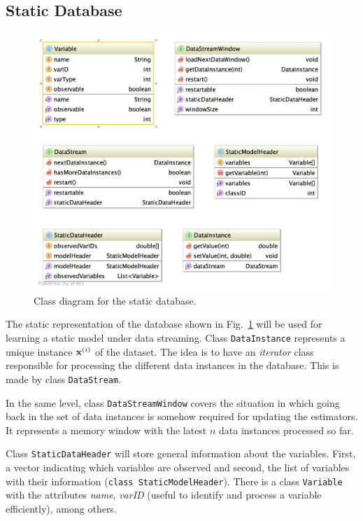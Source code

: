 \documentclass[a4paper,12pt]{article}
\begin{document}
\subsection{Static Database}
\label{subsec:staticDatabase}

\begin{figure}[h]
\includegraphics[width=14cm]{staticDB.jpg}
\caption{Class diagram for the static database.}
\label{fig:staticDB}
\end{figure}

The static representation of the database shown in  Fig.~\ref{fig:staticDB} will be 
used for learning a static model under data streaming. Class 
\texttt{DataInstance} represents a unique instance $\x^{(i)}$ of the dataset. The idea is to
have an \emph{iterator} class responsible for processing the different data instances 
in the database. This is made by class \texttt{DataStream}. 

In the same level, class \texttt{DataStreamWindow} covers the situation in which 
going back in the set of data instances is somehow required for updating the 
estimators. It represents a memory window with the latest $n$ data instances 
processed so far.

Class \texttt{StaticDataHeader} will store general information about the variables. 
First, a vector indicating which variables are observed and second, the list of variables
with their information (\texttt{class StaticModelHeader}). There is a class \texttt{Variable}
with the attributes \emph{name}, \emph{varID} (useful to identify and process a 
variable efficiently), among others.
\end{document}
